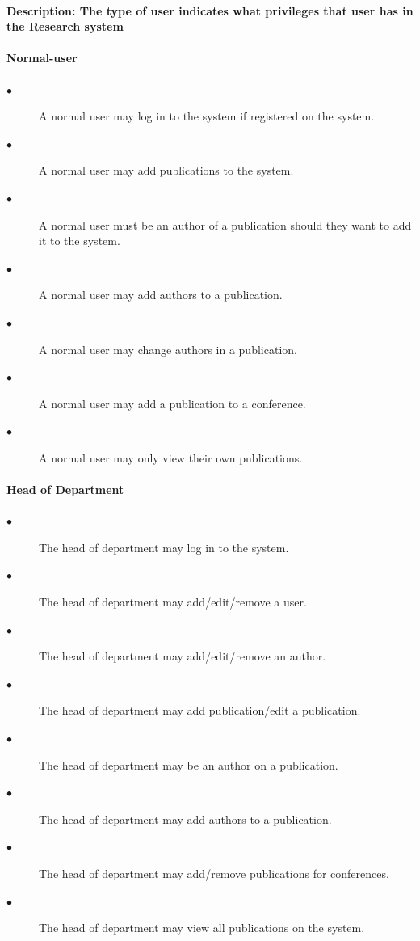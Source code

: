 \documentclass[a4paper]{article}
\begin{document}
	\paragraph{\textbf{Description:} The type of user indicates what privileges that user has in the Research system}
	\paragraph{\textbf{Normal-user}}
	\begin{description}
		\item[$\bullet$] A normal user may log in to the system if registered on the system.
		\item[$\bullet$] A normal user may add publications to the system.
		\item[$\bullet$] A normal user must be an author of a publication should they want to add it to the system.
		\item[$\bullet$] A normal user may add authors to a publication.
		\item[$\bullet$] A normal user may change authors in a publication.
		\item[$\bullet$] A normal user may add a publication to a conference.
		\item[$\bullet$] A normal user may only view their own publications.
	\end{description}
	\paragraph{\textbf{Head of Department}}
	\begin{description}
		\item[$\bullet$] The head of department may log in to the system.
		\item[$\bullet$] The head of department may add/edit/remove a user.
		\item[$\bullet$] The head of department may add/edit/remove an author.
		\item[$\bullet$] The head of department may add publication/edit a publication.
		\item[$\bullet$] The head of department may be an author on a publication.
		\item[$\bullet$] The head of department may add authors to a publication.
		\item[$\bullet$] The head of department may add/remove publications for conferences.
		\item[$\bullet$] The head of department may view all publications on the system.
	\end{description}
\end{document}
